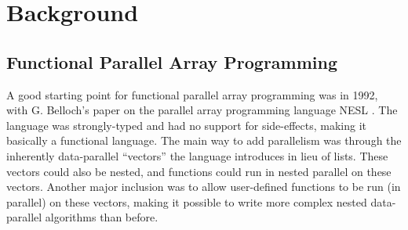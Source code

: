 \section{Background}
    \subsection{Functional Parallel Array Programming}
        A good starting point for functional parallel array programming was in 1992, with G. Belloch's paper on the parallel array programming language NESL \cite{blelloch1992nesl}.
        The language was strongly-typed and had no support for side-effects, making it basically a functional language.
        The main way to add parallelism was through the inherently data-parallel ``vectors'' the language introduces in lieu of lists.
        These vectors could also be nested, and functions could run in nested parallel on these vectors.
        Another major inclusion was to allow user-defined functions to be run (in parallel) on these vectors, making it possible to write more complex nested data-parallel algorithms than before.

